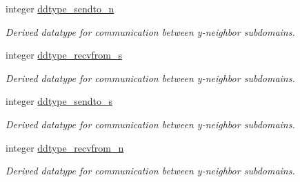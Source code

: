 \textbf{ }\par
\begin{DoxyCompactItemize}
\item 
integer \mbox{\hyperlink{namespacempi__subdomain_a55f5c1af9bd941fd176e619bddbb8d82}{ddtype\+\_\+sendto\+\_\+n}}
\begin{DoxyCompactList}\small\item\em Derived datatype for communication between y-\/neighbor subdomains. \end{DoxyCompactList}\item 
integer \mbox{\hyperlink{namespacempi__subdomain_a1f46916f08758533cad3ecac33233e38}{ddtype\+\_\+recvfrom\+\_\+s}}
\begin{DoxyCompactList}\small\item\em Derived datatype for communication between y-\/neighbor subdomains. \end{DoxyCompactList}\item 
integer \mbox{\hyperlink{namespacempi__subdomain_a660f83d621188fb7eb60ad10eab4c9b5}{ddtype\+\_\+sendto\+\_\+s}}
\begin{DoxyCompactList}\small\item\em Derived datatype for communication between y-\/neighbor subdomains. \end{DoxyCompactList}\item 
integer \mbox{\hyperlink{namespacempi__subdomain_a74f1edb3c9227692b250285680518dc4}{ddtype\+\_\+recvfrom\+\_\+n}}
\begin{DoxyCompactList}\small\item\em Derived datatype for communication between y-\/neighbor subdomains. \end{DoxyCompactList}\end{DoxyCompactItemize}

